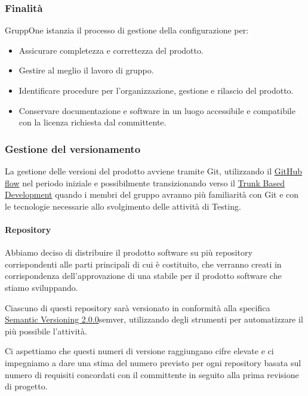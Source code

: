 \documentclass[../../norme-di-progetto.tex]{subfiles}
\begin{document}
\subsubsection{Finalità}%
\label{subs:gestione_della_configurazione/finalita}

GruppOne istanzia il processo di gestione della configurazione per:
\begin{itemize}
  \item Assicurare completezza e correttezza del prodotto.
  \item Gestire al meglio il lavoro di gruppo.
  \item Identificare procedure per l'organizzazione, gestione e rilascio del prodotto.
  \item Conservare documentazione e software in un luogo accessibile e compatibile con la licenza richiesta dal committente.
\end{itemize}

\subsubsection{Gestione del versionamento}%
\label{subs:gestione_del_versionamento}

La gestione delle versioni del prodotto avviene tramite Git, utilizzando il \href{https://help.github.com/en/github/collaborating-with-issues-and-pull-requests/github-flow}{GitHub flow} nel periodo iniziale e possibilmente transizionando verso il \href{https://trunkbaseddevelopment.com/}{Trunk Based Development} quando i membri del gruppo avranno più familiarità con Git e con le tecnologie necessarie allo svolgimento delle attività di Testing.

\paragraph{Repository}%
\label{par:repository}

Abbiamo deciso di distribuire il prodotto software su più repository corrispondenti alle parti principali di cui è costituito, che verranno creati in corrispondenza dell'approvazione di una  stabile per il prodotto software che stiamo sviluppando.

Ciascuno di questi repository sarà versionato in conformità alla specifica \href{https://semver.org/spec/v2.0.0.html}{Semantic Versioning 2.0.0}{semver}, utilizzando degli strumenti per automatizzare il più possibile l'attività.

Ci aspettiamo che questi numeri di versione raggiungano cifre elevate e ci impegniamo a dare una stima del numero previsto per ogni repository basata sul numero di requisiti concordati con il committente in seguito alla prima revisione di progetto.
\end{document}
